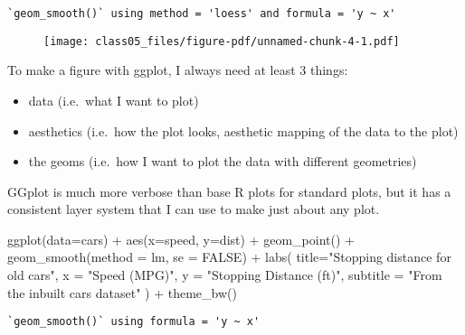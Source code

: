 \documentclass[
  letterpaper,
  DIV=11,
  numbers=noendperiod]{scrartcl}
\newenvironment{Shaded}{\begin{snugshade}}{\end{snugshade}}
\newcommand{\AttributeTok}[1]{\textcolor[rgb]{0.40,0.45,0.13}{#1}}
\newcommand{\ConstantTok}[1]{\textcolor[rgb]{0.56,0.35,0.01}{#1}}
\newcommand{\FunctionTok}[1]{\textcolor[rgb]{0.28,0.35,0.67}{#1}}
\newcommand{\NormalTok}[1]{\textcolor[rgb]{0.00,0.23,0.31}{#1}}
\newcommand{\SpecialCharTok}[1]{\textcolor[rgb]{0.37,0.37,0.37}{#1}}
\newcommand{\StringTok}[1]{\textcolor[rgb]{0.13,0.47,0.30}{#1}}
\begin{document}
\begin{verbatim}
`geom_smooth()` using method = 'loess' and formula = 'y ~ x'
\end{verbatim}

\begin{figure}[H]

{\centering \texttt{[image: class05\_files/figure-pdf/unnamed-chunk-4-1.pdf]}

}

\end{figure}

To make a figure with ggplot, I always need at least 3 things:

\begin{itemize}
\item
  data (i.e.~what I want to plot)
\item
  aesthetics (i.e.~how the plot looks, aesthetic mapping of the data to
  the plot)
\item
  the geoms (i.e.~how I want to plot the data with different geometries)
\end{itemize}

GGplot is much more verbose than base R plots for standard plots, but it
has a consistent layer system that I can use to make just about any
plot.

\begin{Shaded}
\begin{Highlighting}[]
\FunctionTok{ggplot}\NormalTok{(}\AttributeTok{data=}\NormalTok{cars) }\SpecialCharTok{+}
  \FunctionTok{aes}\NormalTok{(}\AttributeTok{x=}\NormalTok{speed, }\AttributeTok{y=}\NormalTok{dist) }\SpecialCharTok{+}
  \FunctionTok{geom\_point}\NormalTok{() }\SpecialCharTok{+}
  \FunctionTok{geom\_smooth}\NormalTok{(}\AttributeTok{method =} \StringTok{\textquotesingle{}lm\textquotesingle{}}\NormalTok{, }\AttributeTok{se =} \ConstantTok{FALSE}\NormalTok{) }\SpecialCharTok{+}
  \FunctionTok{labs}\NormalTok{(}
       \AttributeTok{title=}\StringTok{"Stopping distance for old cars"}\NormalTok{, }
       \AttributeTok{x =} \StringTok{"Speed (MPG)"}\NormalTok{, }
       \AttributeTok{y =} \StringTok{"Stopping Distance (ft)"}\NormalTok{, }
       \AttributeTok{subtitle =} \StringTok{"From the inbuilt cars dataset"}
\NormalTok{       ) }\SpecialCharTok{+}
  \FunctionTok{theme\_bw}\NormalTok{()}
\end{Highlighting}
\end{Shaded}

\begin{verbatim}
`geom_smooth()` using formula = 'y ~ x'
\end{verbatim}
\end{document}

